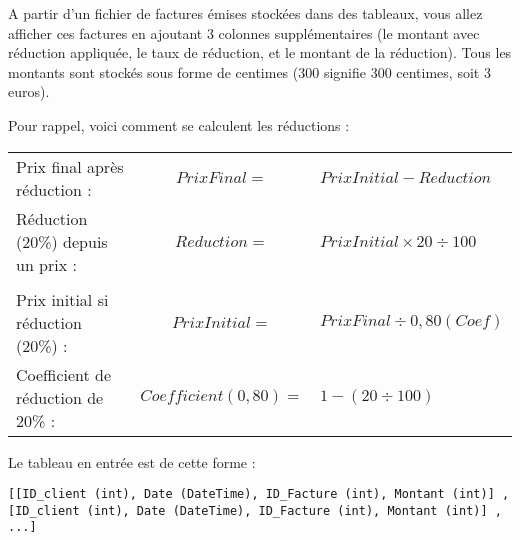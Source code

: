 

\vspace*{0.7cm}

\noindent {}

\bigskip

\noindent A partir d'un fichier de factures émises stockées dans des tableaux, vous allez afficher ces factures en ajoutant 3 colonnes supplémentaires (le montant avec réduction appliquée, le taux de réduction, et le montant de la réduction).
Tous les montants sont stockés sous forme de centimes (300 signifie 300 centimes, soit 3 euros).

\bigskip

\noindent Pour rappel, voici comment se calculent les réductions :\\

\begin{tabular}{l c l}
Prix final après réduction : & $ Prix Final = $ & $ Prix Initial - Reduction $ \\
Réduction (20\%) depuis un prix : & $ Reduction = $ & $ Prix Initial \times 20 \div 100 $ \\
 & & \\
Prix initial si réduction (20\%) : & $ Prix Initial = $ & $ Prix Final \div 0,80 (Coef) $ \\
Coefficient de réduction de 20\% : & $ Coefficient (0,80) = $ & $ 1 - (20 \div 100) $ \\
\end{tabular}

\bigskip

\bigskip

\noindent Le tableau en entrée est de cette forme : \\

\lstset{language=sh}
\begin{lstlisting}[frame=single,title={Tableau en entrée}]
[[ID_client (int), Date (DateTime), ID_Facture (int), Montant (int)] , [ID_client (int), Date (DateTime), ID_Facture (int), Montant (int)] , ...]
\end{lstlisting}

